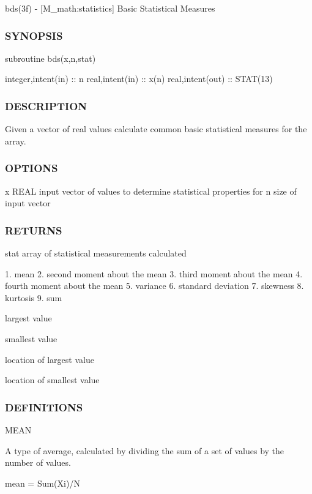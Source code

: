 bds(3f) -\/ \mbox{[}M\+\_\+math\+:statistics\mbox{]} Basic Statistical Measures \subsubsection*{S\+Y\+N\+O\+P\+S\+IS}

subroutine bds(x,n,stat)

integer,intent(in) \+:\+: n real,intent(in) \+:\+: x(n) real,intent(out) \+:\+: S\+T\+A\+T(13) \subsubsection*{D\+E\+S\+C\+R\+I\+P\+T\+I\+ON}

\begin{DoxyVerb} Given a vector of real values calculate common basic statistical measures for
 the array.
\end{DoxyVerb}


\subsubsection*{O\+P\+T\+I\+O\+NS}

x R\+E\+AL input vector of values to determine statistical properties for n size of input vector \subsubsection*{R\+E\+T\+U\+R\+NS}

stat array of statistical measurements calculated \begin{DoxyVerb}1.  mean
2.  second moment about the mean
3.  third moment about the mean
4.  fourth moment about the mean
5.  variance
6.  standard deviation
7.  skewness
8.  kurtosis
9.  sum
\end{DoxyVerb}

\begin{DoxyEnumerate}
\item largest value
\item smallest value
\item location of largest value
\item location of smallest value
\end{DoxyEnumerate}

\subsubsection*{D\+E\+F\+I\+N\+I\+T\+I\+O\+NS}

M\+E\+AN \begin{DoxyVerb}   A type of average, calculated by dividing the sum of
   a set of values by the number of values.

      mean = Sum(Xi)/N
\end{DoxyVerb}


